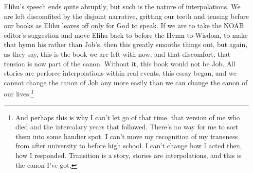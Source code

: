 Elihu's speech ends quite abruptly, but such is the nature of interpolations. We are left discomfited by the disjoint narrative, gritting our teeth and tensing before our books as Elihu leaves off only for God to speak. If we are to take the NOAB editor's suggestion and move Elihu back to before the Hymn to Wisdom, to make that hymn his rather than Job's, then this greatly smooths things out, but again, as they say, this is the book we are left with now, and that discomfort, that tension is now part of the canon. Without it, this book would not be Job. All stories are perforce interpolations within real events, this essay began, and we cannot change the canon of Job any more easily than we can change the canon of our lives.\footnote{And perhaps this is why I can't let go of that time, that version of me who died and the intercalary years that followed. There's no way for me to sort them into some handier spot. I can't move my recognition of my transness from after university to before high school. I can't change how I acted then, how I responded. Transition is a story, stories are interpolations, and this is the canon I've got.}
